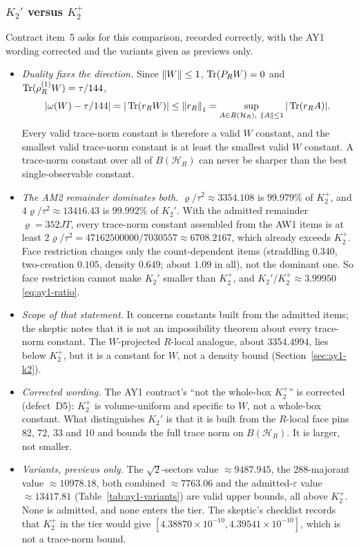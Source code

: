 \subsubsection{\texorpdfstring{$K_2'$ versus $K_2^+$}{K2' versus K2+}}
\label{sec:ay2-k2}
Contract item~5 asks for this comparison, recorded correctly, with the AY1
wording corrected and the variants given as previews only.
\begin{itemize}
\item \emph{Duality fixes the direction.} Since $\left\lVert W\right\rVert\le1$,
 $\operatorname{Tr}(P_RW)=0$ and $\operatorname{Tr}(\rho^{(1)}_RW)=\tau/144$,
 \begin{equation}
 |\omega(W)-\tau/144|=|\operatorname{Tr}(r_RW)|\le\left\lVert r_R\right\rVert_1
 =\sup_{A\in B(\mathcal H_R),\ \left\lVert A\right\rVert\le1}|\operatorname{Tr}(r_RA)| .
 \label{eq:ay2-duality}
 \end{equation}
 Every valid trace-norm constant is therefore a valid $W$ constant, and the
 smallest valid trace-norm constant is at least the smallest valid $W$
 constant. A trace-norm constant over all of $B(\mathcal H_R)$ can never be
 sharper than the best single-observable constant.
\item \emph{The AM2 remainder dominates both.} $\varrho/\tau^2\approx3354.108$
 is $99.979\%$ of $K_2^+$, and $4\varrho/\tau^2\approx13416.43$ is
 $99.992\%$ of $K_2'$. With the admitted remainder $\varrho=352JT$, every
 trace-norm constant assembled from the AW1 items is at least
 $2\varrho/\tau^2=47162500000/7030557\approx6708.2167$, which already exceeds
 $K_2^+$. Face restriction changes only the count-dependent items
 (straddling $0.340$, two-creation $0.105$, density $0.649$; about $1.09$ in
 all), not the dominant one. So face restriction cannot make $K_2'$ smaller
 than $K_2^+$, and $K_2'/K_2^+\approx3.99950$ \eqref{eq:ay1-ratio}.
\item \emph{Scope of that statement.} It concerns constants built from the
 admitted items; the skeptic notes that it is not an impossibility theorem
 about every trace-norm constant. The $W$-projected $R$-local analogue,
 about $3354.4994$, lies below $K_2^+$, but it is a constant for $W$, not a
 density bound (Section~\ref{sec:ay1-k2}).
\item \emph{Corrected wording.} The AY1 contract's ``not the whole-box
 $K_2^+$'' is corrected (defect~D5): $K_2^+$ is volume-uniform and specific
 to $W$, not a whole-box constant. What distinguishes $K_2'$ is that it is
 built from the $R$-local face pins 82, 72, 33 and 10 and bounds the full
 trace norm on $B(\mathcal H_R)$. It is larger, not smaller.
\item \emph{Variants, previews only.} The $\sqrt2$-sectors value
 $\approx9487.945$, the 288-majorant value $\approx10978.18$, both combined
 $\approx7763.06$ and the admitted-$\varepsilon$ value $\approx13417.81$
 (Table~\ref{tab:ay1-variants}) are valid upper bounds, all above $K_2^+$.
 None is admitted, and none enters the tier. The skeptic's checklist records
 that $K_2^+$ in the tier would give
 $[4.38870\times10^{-10},4.39541\times10^{-10}]$, which is not a trace-norm
 bound.
\end{itemize}

